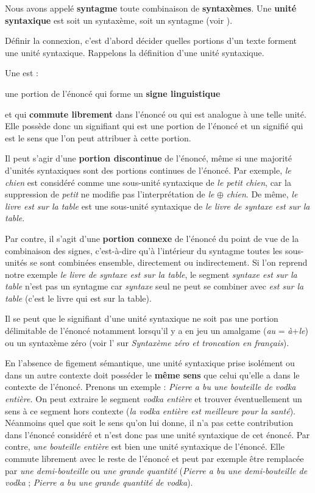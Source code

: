 Nous avons appelé \textbf{syntagme} toute combinaison de \textbf{syntaxèmes}. Une \textbf{unité syntaxique} est soit un syntaxème, soit un syntagme (voir ).

Définir la connexion, c’est d’abord décider quelles portions d’un texte forment une unité syntaxique. Rappelons la définition d’une unité syntaxique.

\begin{styleLivreImportant}
Une  est :

 une portion de l’énoncé qui forme un \textbf{signe linguistique}
   \item et qui \textbf{commute librement} dans l’énoncé ou qui est analogue à une telle unité.
Elle possède donc un signifiant qui est une portion de l’énoncé et un signifié qui est le sens que l’on peut attribuer à cette portion.
\end{styleLivreImportant}

Il peut s’agir d’une \textbf{portion discontinue} de l’énoncé, même si une majorité d’unités syntaxiques sont des portions continues de l’énoncé. Par exemple, \textit{le chien} est considéré comme une sous-unité syntaxique de \textit{le petit chien}, car la suppression de \textit{petit} ne modifie pas l’interprétation de \textit{le} \textbf{${\oplus}$} \textit{chien}. De même, \textit{le livre est sur la table} est une sous-unité syntaxique de \textit{le livre de syntaxe est sur la table}.

Par contre, il s’agit d’une \textbf{portion connexe} de l’énoncé du point de vue de la combinaison des signes, c’est-à-dire qu’à l’intérieur du syntagme toutes les sous-unités se sont combinées ensemble, directement ou indirectement. Si l’on reprend notre exemple \textit{le livre de syntaxe est sur la table}, le segment \textit{syntaxe est sur la table} n’est pas un syntagme car \textit{syntaxe} seul ne peut se combiner avec \textit{est sur la table} (c’est le livre qui est sur la table).

Il se peut que le signifiant d’une unité syntaxique ne soit pas une portion délimitable de l’énoncé notamment lorsqu’il y a en jeu un amalgame (\textit{au} = \textit{à}+\textit{le}) ou un syntaxème zéro (voir l’ sur \textit{Syntaxème zéro et troncation en français}).

En l’absence de figement sémantique, une unité syntaxique prise isolément ou dans un autre contexte doit posséder le \textbf{même sens} que celui qu’elle a dans le contexte de l’énoncé. Prenons un exemple : \textit{Pierre a bu une bouteille de vodka entière.} On peut extraire le segment \textit{vodka entière} et trouver éventuellement un sens à ce segment hors contexte (\textit{la vodka entière est meilleure pour la santé}). Néanmoins quel que soit le sens qu’on lui donne, il n’a pas cette contribution dans l’énoncé considéré et n’est donc pas une unité syntaxique de cet énoncé. Par contre, \textit{une bouteille entière} est bien une unité syntaxique de l’énoncé. Elle commute librement avec le reste de l’énoncé et peut par exemple être remplacée par \textit{une demi-bouteille} ou \textit{une grande quantité} (\textit{Pierre a bu une demi-bouteille de vodka} ; \textit{Pierre a bu une grande quantité de vodka}).

